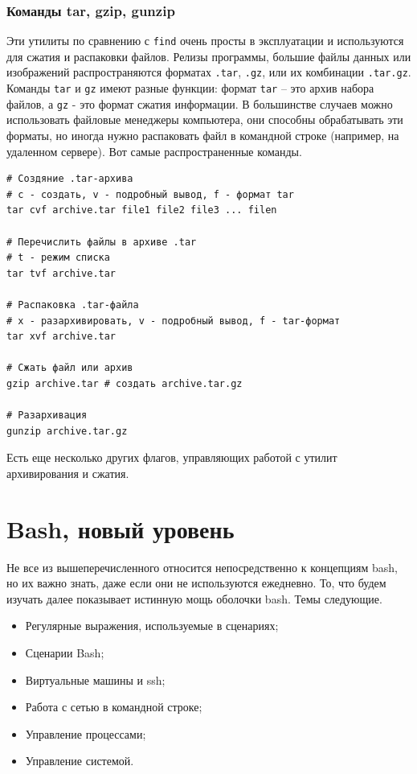 \documentclass[12pt]{article}
\providecommand{\tightlist}{%
  \setlength{\itemsep}{0pt}\setlength{\parskip}{0pt}}
\begin{document}
\hypertarget{tar-gzip-gunzip}{%
\subsubsection{\texorpdfstring{\protect\hyperlink{tar-gzip-gunzip}{}Команды
tar, gzip, gunzip}{Команды tar, gzip, gunzip}}\label{tar-gzip-gunzip}}

Эти утилиты по сравнению с \texttt{find} очень просты в эксплуатации и используются
для сжатия и распаковки файлов. Релизы программы,
большие файлы данных или изображений распространяются форматах
\texttt{.tar}, \texttt{.gz}, или их комбинации \texttt{.tar.gz}. Команды \texttt{tar} и
\texttt{gz} имеют разные функции: формат \texttt{tar} -- это архив
набора файлов, а \texttt{gz} - это формат сжатия информации. В
большинстве случаев можно использовать файловые менеджеры компьютера, они
способны обрабатывать эти форматы, но иногда нужно распаковать файл в
командной строке (например, на удаленном сервере). Вот самые
распространенные команды.
\begin{verbatim}
# Создяние .tar-архива
# c - создать, v - подробный вывод, f - формат tar
tar cvf archive.tar file1 file2 file3 ... filen

# Перечислить файлы в архиве .tar
# t - режим списка
tar tvf archive.tar

# Распаковка .tar-файла
# x - разархивировать, v - подробный вывод, f - tar-формат
tar xvf archive.tar

# Сжать файл или архив
gzip archive.tar # создать archive.tar.gz

# Разархивация
gunzip archive.tar.gz
\end{verbatim}
Есть еще несколько других флагов, управляющих работой с утилит
архивирования и сжатия.

\hypertarget{Advanced-Bash}{%
\section{\texorpdfstring{\protect\hyperlink{Advanced-Bash}{}Bash, новый
уровень}{Bash, новый уровень}}\label{Advanced-Bash}}

Не все из вышеперечисленного относится непосредственно к концепциям
bash, но их важно знать, даже если они не используются ежедневно. То,
что будем изучать далее показывает истинную мощь оболочки bash. Темы
следующие.
\begin{itemize}
\tightlist
\item
  Регулярные выражения, используемые в сценариях;
\item
  Сценарии Bash;
\item
  Виртуальные машины и ssh;
\item
  Работа с сетью в командной строке;
\item
  Управление процессами;
\item
  Управление системой.
\end{itemize}
\end{document}
